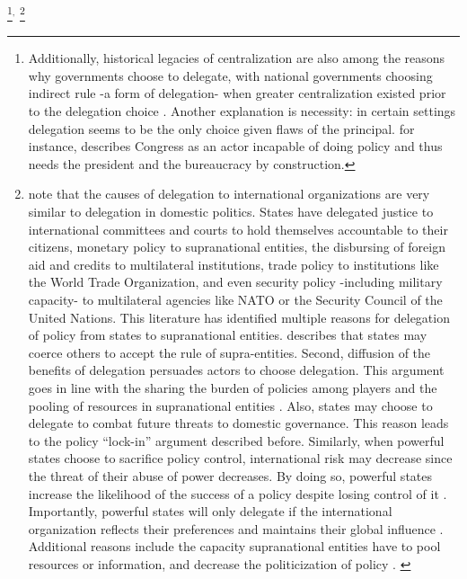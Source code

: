 \footnote{Additionally, historical legacies of centralization are also among the reasons why governments choose to delegate, with national governments choosing indirect rule -a form of delegation- when greater centralization existed prior to the delegation choice \citep{gerring_etal_2011}. Another explanation is necessity: in certain settings delegation seems to be the only choice given flaws of the principal. \citet{huntington_1995} for instance, describes Congress as an actor incapable of doing policy and thus needs the president and the bureaucracy by construction.}$^,$ \footnote{\citet{Hawkins_etal_2006} note that the causes of delegation to international organizations are very similar to delegation in domestic politics. States have delegated justice to international committees and courts to hold themselves accountable to their citizens, monetary policy to supranational entities, the disbursing of foreign aid and credits to multilateral institutions, trade policy to institutions like the World Trade Organization, and even security policy -including military capacity- to multilateral agencies like NATO or the Security Council of the United Nations. This literature has identified multiple reasons for delegation of policy from states to supranational entities. \citet{Moravcsik_2000} describes that states may coerce others to accept the rule of supra-entities. Second, diffusion of the benefits of delegation persuades actors to choose delegation. This argument goes in line with the sharing the burden of policies among players and the pooling of resources in supranational entities \citep{milner_2011}. Also, states may choose to delegate to combat future threats to domestic governance. This reason leads to the policy ``lock-in'' argument described before. Similarly, when powerful states choose to sacrifice policy control, international risk may decrease since the threat of their abuse of power decreases. By doing so, powerful states increase the likelihood of the success of a policy despite losing control of it \citep{lake_2009, milner_2011}. Importantly, powerful states will only delegate if the international organization reflects their preferences and maintains their global influence \citep{Hawkins_etal_2006}. Additional reasons include the capacity supranational entities have to pool resources or information, and decrease the politicization of policy \citet{Rodrick_1996}. \label{footnote:international_delegation}} 


